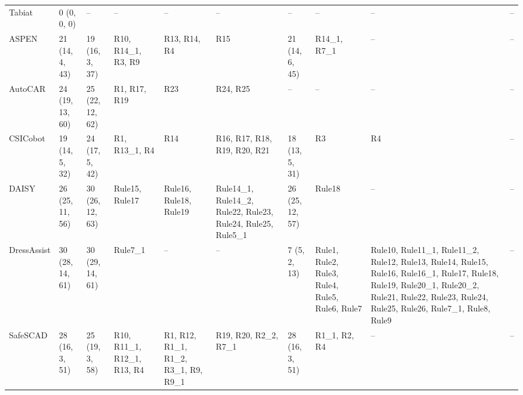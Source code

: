 \begin{table}[t]
{\begin{tabular}{llllllllll}
Tabiat & 0 (0, 0, 0) & -- & -- & -- & -- & -- & -- & -- & -- \\
ASPEN & 21 (14, 4, 43) & 19 (16, 3, 37) & R10, R14\_1, R3, R9 & R13, R14, R4 & R15 & 21 (14, 6, 45) & R14\_1, R7\_1 & -- & -- \\
AutoCAR & 24 (19, 13, 60) & 25 (22, 12, 62) & R1, R17, R19 & R23 & R24, R25 & -- & -- & -- & -- \\
CSICobot & 19 (14, 5, 32) & 24 (17, 5, 42) & R1, R13\_1, R4 & R14 & R16, R17, R18, R19, R20, R21 & 18 (13, 5, 31) & R3 & R4 & -- \\
DAISY & 26 (25, 11, 56) & 30 (26, 12, 63) & Rule15, Rule17 & Rule16, Rule18, Rule19 & Rule14\_1, Rule14\_2, Rule22, Rule23, Rule24, Rule25, Rule5\_1 & 26 (25, 12, 57) & Rule18 & -- & -- \\
DressAssist & 30 (28, 14, 61) & 30 (29, 14, 61) & Rule7\_1 & -- & -- & 7 (5, 2, 13) & Rule1, Rule2, Rule3, Rule4, Rule5, Rule6, Rule7 & Rule10, Rule11\_1, Rule11\_2, Rule12, Rule13, Rule14, Rule15, Rule16, Rule16\_1, Rule17, Rule18, Rule19, Rule20\_1, Rule20\_2, Rule21, Rule22, Rule23, Rule24, Rule25, Rule26, Rule7\_1, Rule8, Rule9 & -- \\
SafeSCAD & 28 (16, 3, 51) & 25 (19, 3, 58) & R10, R11\_1, R12\_1, R13, R4 & R1, R12, R1\_1, R1\_2, R3\_1, R9, R9\_1 & R19, R20, R2\_2, R7\_1 & 28 (16, 3, 51) & R1\_1, R2, R4 & -- & -- \\
\bottomrule
\end{tabular}%
}
\end{table}
